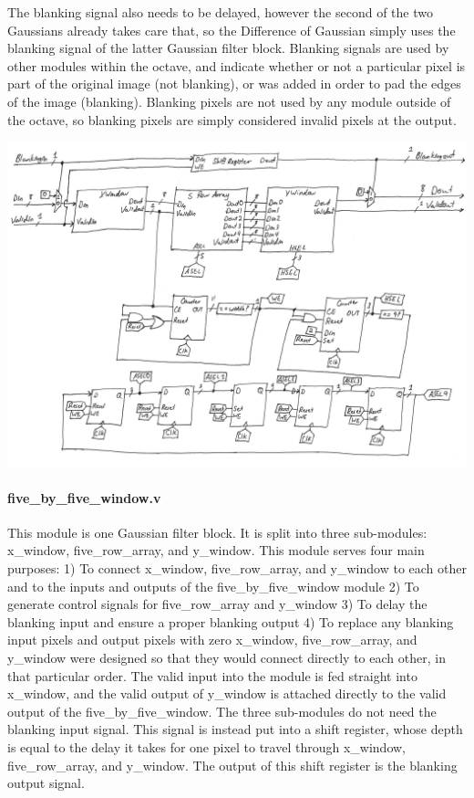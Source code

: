 \documentclass[12pt]{article}
\begin{document}
The blanking signal also needs to be delayed, however the second of the two 
Gaussians already takes care that, so the Difference of Gaussian simply uses the 
blanking signal of the latter Gaussian filter block. Blanking signals are used 
by other modules within the octave, and indicate whether or not a particular 
pixel is part of the original image (not blanking), or was added in order to pad 
the edges of the image (blanking). Blanking pixels are not used by any module 
outside of the octave, so blanking pixels are simply considered invalid pixels 
at the output.

\includegraphics[width=\textwidth]{processed_image_pngs/5x5_block.png}

\paragraph{five\_by\_five\_window.v}

This module is one Gaussian filter block. It is split into three sub-modules: 
x\_window, five\_row\_array, and y\_window. This module serves four main purposes:
1) To connect x\_window, five\_row\_array, and y\_window to each other and to the 
   inputs and outputs of the five\_by\_five\_window module
2) To generate control signals for five\_row\_array and y\_window
3) To delay the blanking input and ensure a proper blanking output
4) To replace any blanking input pixels and output pixels with zero
x\_window, five\_row\_array, and y\_window were designed so that they would connect 
directly to each other, in that particular order. The valid input into the 
module is fed straight into x\_window, and the valid output of y\_window is 
attached directly to the valid output of the five\_by\_five\_window.
The three sub-modules do not need the blanking input signal. This signal is 
instead put into a shift register, whose depth is equal to the delay it takes 
for one pixel to travel through x\_window, five\_row\_array, and y\_window. The 
output of this shift register is the blanking output signal.
\end{document}
